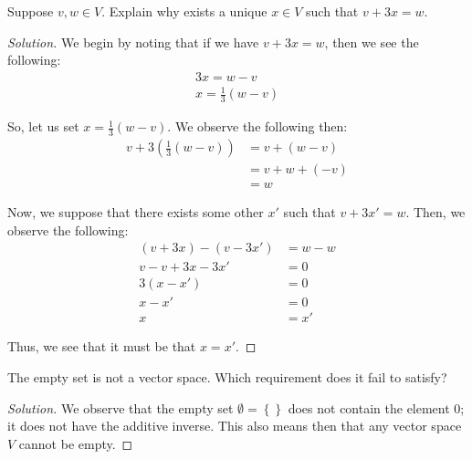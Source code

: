 \documentclass[openany]{book}
\newenvironment{solution}{\begin{proof}[Solution]}{\end{proof}}
\begin{document}
	\begin{hw}
		Suppose $v, w \in V$. Explain why exists a unique $x \in V$ such that $v + 3x = w$.
	\end{hw}
	\begin{solution}
		We begin by noting that if we have $v + 3x = w$, then we see the following:
		\begin{align*}
			3x = w - v \\
			x = \frac{1}{3}(w-v)
		\end{align*}
	
		So, let us set $x = \frac{1}{3}(w-v)$. We observe the following then:
		\begin{align*}
			v + 3(\frac{1}{3}(w-v)) &= v + (w-v) \\
			&= v + w + (-v) \\
			&= w
		\end{align*}
	
		Now, we suppose that there exists some other $x'$ such that $v + 3x' = w$. Then, we observe the following:
		\begin{align*}
			(v + 3x) - (v - 3x') &= w - w \\
			v - v + 3x - 3x' &= 0 \\
			3(x-x') &= 0 \\
			x-x' &= 0 \\
			x &= x'
		\end{align*}
	
		Thus, we see that it must be that $x = x'$.
	\end{solution}

	\begin{hw}
		The empty set is not a vector space. Which requirement does it fail to satisfy?
	\end{hw}
	\begin{solution}
		We observe that the empty set $\emptyset = \left\{  \right\}$ does not contain the element $0$; it does not have the additive inverse. This also means then that any vector space $V$ cannot be empty. 
	\end{solution}
\end{document}
